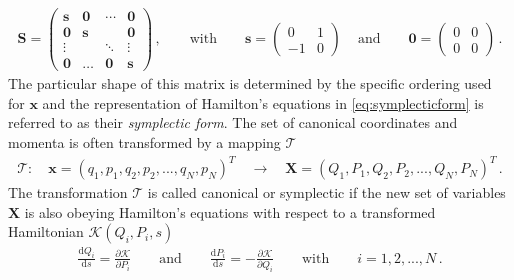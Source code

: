 \begin{align}
\mathbf{S}
=
\begin{pmatrix}
\mathbf{s} & \mathbf{0}  & \cdots  & \mathbf{0} \\ 
\mathbf{0} & \mathbf{s} &  & \mathbf{0} \\ 
\vdots &  & \ddots  & \vdots \\ 
\mathbf{0} & \hdots & \mathbf{0} & \mathbf{s}
\end{pmatrix} \, ,
 \quad \quad \text{with} \quad \quad \mathbf{s} = 
 \begin{pmatrix}
0 & 1\\ 
-1 &  0
\end{pmatrix} \, \quad \text{and}
 \quad \quad \mathbf{0} = 
 \begin{pmatrix}
0 &  0\\ 
0 &  0
\end{pmatrix} \, .
\end{align}
The particular shape of this matrix is determined by the specific ordering used for $\mathbf{x}$ and the representation of Hamilton's equations in \eqref{eq:symplecticform} is referred to as their \textit{symplectic form}. The set of canonical coordinates and momenta is often transformed by a mapping $\mathcal{T}$
\begin{align}
\mathcal{T}:  \quad \mathbf{x} = (q_1,p_1,q_2,p_2,...,q_N,p_N)^T \quad \rightarrow \quad \mathbf{X} = (Q_1,P_1,Q_2,P_2,...,Q_N,P_N)^T \, .
\end{align}
%
%
%
%
%
The transformation $\mathcal{T}$ is called canonical or symplectic if the new set of variables $\mathbf{X}$ is also obeying Hamilton's equations with respect to a transformed Hamiltonian $\mathcal{K}(Q_i,P_i,s)$
\begin{align}
\frac{\mathrm{d} Q_i}{\mathrm{d}s} = \frac{\partial \mathcal{K}}{\partial P_i} \quad \quad \text{and} \quad \quad \frac{\mathrm{d} P_i}{\mathrm{d}s} = -\frac{\partial \mathcal{K}}{\partial Q_i} \quad \quad \text{with} \quad \quad i=1,2,...,N\,.
\end{align}
